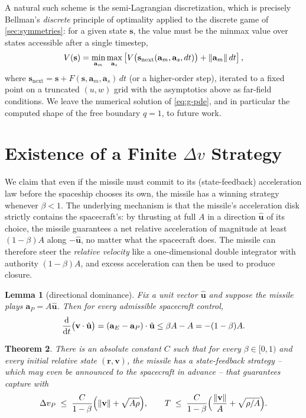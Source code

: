 \documentclass{article}
\renewcommand{\vec}[1]{\mathbf{#1}}
\newtheorem{theorem}{Theorem}
\newtheorem{lemma}[theorem]{Lemma}
\theoremstyle{remark}
\begin{document}
A natural such scheme is the semi-Lagrangian discretization, which is
precisely Bellman's \emph{discrete} principle of optimality applied to the
discrete game of \cref{sec:symmetries}: for a given state $\vec s$, the value
must be the minmax value over states accessible after a single timestep,
\begin{align}
V(\vec{s}) = \min_{\vec{a}_m} \max_{\vec{a}_s} \left[
  V\big(\vec{s}_\text{next}(\vec{a}_m, \vec{a}_s, dt)\big) +
  \norm{\vec{a}_m} \, dt
\right],
\end{align}
where $\vec{s}_\text{next} = \vec{s} + F(\vec s, \vec a_m, \vec a_s)\, dt$ (or
a higher-order step), iterated to a fixed point on a truncated $(u, w)$ grid
with the asymptotics above as far-field conditions.  We leave the numerical
solution of \cref{eq:g-pde}, and in particular the computed shape of the free
boundary $q = 1$, to future work.

\section{Existence of a Finite $\Delta v$ Strategy}
\label{sec:finite-dv}

We claim that even if the missile must commit to its (state-feedback)
acceleration law before the spaceship chooses its own, the missile has a
winning strategy whenever $\beta < 1$.  The underlying mechanism is that the
missile's acceleration disk strictly contains the spacecraft's: by thrusting at
full $A$ in a direction $\hat{\vec u}$ of its choice, the missile guarantees a
net relative acceleration of magnitude at least $(1-\beta)A$ along
$-\hat{\vec u}$, no matter what the spacecraft does.  The missile can therefore
steer the \emph{relative velocity} like a one-dimensional double integrator
with authority $(1-\beta)A$, and excess acceleration can then be used to
produce closure.

\begin{lemma}[directional dominance]
  \label{lem:dominance}
  Fix a unit vector $\hat{\vec u}$ and suppose the missile plays
  $\vec a_P = A \hat{\vec u}$.  Then for every admissible spacecraft control,
  \[
    \dv{t}\big(\vec v \cdot \hat{\vec u}\big)
    = (\vec a_E - \vec a_P)\cdot \hat{\vec u}
    \le \beta A - A = -(1-\beta) A .
  \]
\end{lemma}

\begin{theorem}
  \label{thm:finite-dv}
  There is an absolute constant $C$ such that for every $\beta \in [0,1)$ and
  every initial relative state $(\vec r, \vec v)$, the missile has a
  state-feedback strategy -- which may even be announced to the spacecraft in
  advance -- that guarantees capture with
  \[
    \Delta v_P \;\le\; \frac{C}{1-\beta}\Big( \norm{\vec v} + \sqrt{A \rho}
    \Big),
    \qquad
    T \;\le\; \frac{C}{1-\beta}\Big( \frac{\norm{\vec v}}{A} +
    \sqrt{\rho / A} \Big).
  \]
\end{theorem}
\end{document}
